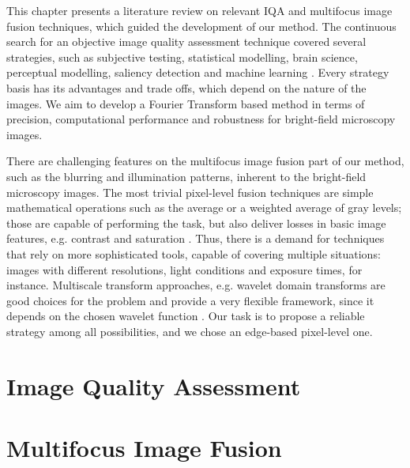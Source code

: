 This chapter presents a literature review on relevant IQA and multifocus image fusion techniques, which guided the development of our method. The continuous search for an objective image quality assessment technique covered several strategies, such as subjective testing, statistical modelling, brain science, perceptual modelling, saliency detection and machine learning \cite{tang2019feature}. Every strategy basis has its advantages and trade offs, which depend on the nature of the images. We aim to develop a Fourier Transform based method in terms of precision, computational performance and robustness for bright-field microscopy images.

There are challenging features on the multifocus image fusion part of our method, such as the blurring and illumination patterns, inherent to the bright-field microscopy images. The most trivial pixel-level fusion techniques are simple mathematical operations such as the average or a weighted average of gray levels; those are capable of performing the task, but also deliver losses in basic image features, e.g. contrast and saturation \cite{zhang2009multifocus}. Thus, there is a demand for techniques that rely on more sophisticated tools, capable of covering multiple situations: images with different resolutions, light conditions and exposure times, for instance. Multiscale transform approaches, e.g. wavelet domain transforms are good choices for the problem and provide a very flexible framework, since it depends on the chosen wavelet function \cite{pajares2004wavelet}. Our task is to propose a reliable strategy among all possibilities, and we chose an edge-based pixel-level one.  

\section{Image Quality Assessment}


\section{Multifocus Image Fusion}
